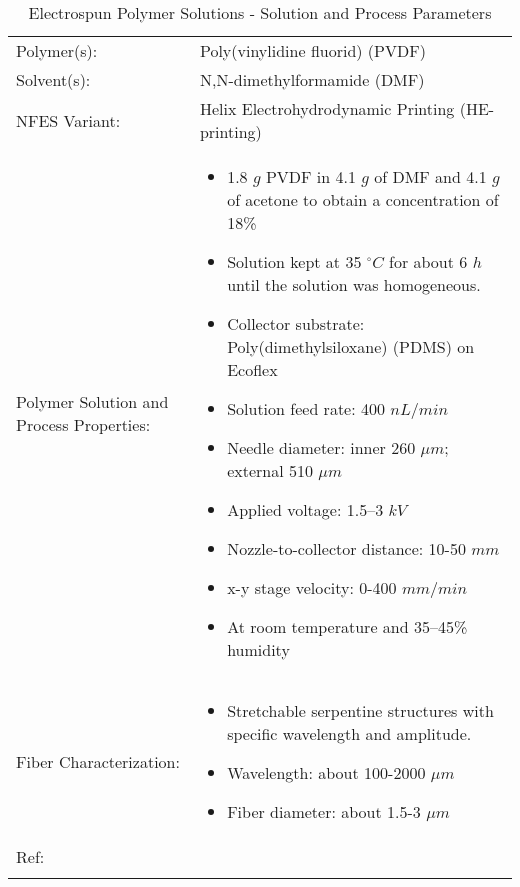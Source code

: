 \begin{table}[th]
\caption{Electrospun Polymer Solutions - Solution and Process Parameters}
\begin{center}
\begin{tabular}{
>{\raggedright\arraybackslash}p{}
>{\raggedright\arraybackslash}p{} }

\hline
Polymer(s): &
Poly(vinylidine fluorid) (PVDF) \\

\arrayrulecolor{lightgray}\hline
Solvent(s): &
N,N-dimethylformamide (DMF) \\

\hline
NFES Variant: &
Helix Electrohydrodynamic Printing (HE-printing) \\

\hline
Polymer Solution and Process Properties: &
\begin{itemize}[leftmargin=*]
\item 1.8 $g$ PVDF in 4.1 $g$ of DMF and 4.1 $g$ of acetone to obtain a concentration of 18\%
\item Solution kept at 35 $^\circ C$ for about 6 $h$ until the solution was homogeneous.
\item Collector substrate: Poly(dimethylsiloxane) (PDMS) on Ecoflex
\item Solution feed rate: 400 $n L / min$
\item Needle diameter: inner 260 $\mu m$; external 510 $\mu m$
\item Applied voltage: 1.5–3 $k V$
\item Nozzle-to-collector distance: 10-50 $m m$
\item x-y stage velocity: 0-400 $m m / min$
\item At room temperature and 35–45\% humidity
\end{itemize} \\

\hline
Fiber Characterization: &
\begin{itemize}[leftmargin=*]
\item Stretchable serpentine structures with specific wavelength and amplitude.
\item Wavelength: about 100-2000 $\mu m$
\item Fiber diameter: about 1.5-3 $\mu m$
\end{itemize} \\

\hline
Ref: & \cite{Duan2017} \\ %
\arrayrulecolor{black}\hline
\label{tbl:FloresCompare}
\end{tabular}
\end{center}
\end{table}

